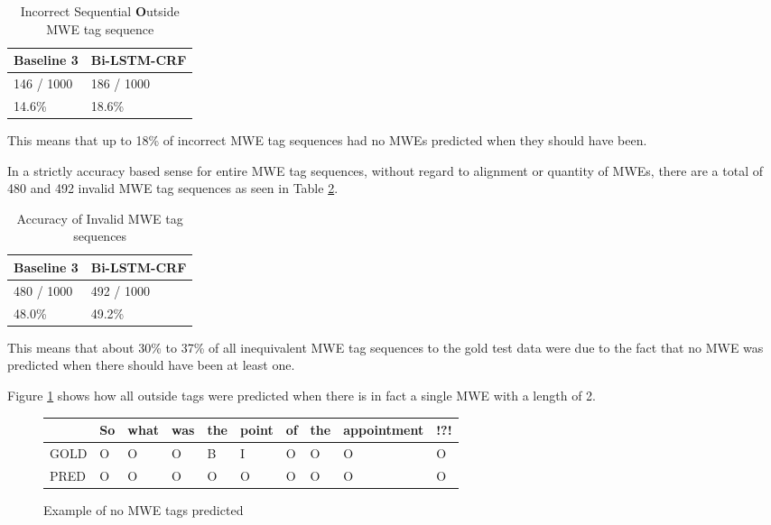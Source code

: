 \begin{table}[H]
    \centering
    \begin{tabular}{ll}
      Baseline 3 & Bi-LSTM-CRF\\
      \hline
      146 / 1000 & 186 / 1000\\
      14.6\% & 18.6\%
    \end{tabular}
  \caption{Incorrect Sequential {\bf O}utside MWE tag sequence}
  \label{tab:inseqoutmwetagseq}
\end{table}

This means that up to 18\% of incorrect MWE tag sequences had no MWEs predicted when they should have been. 

In a strictly accuracy based sense for entire MWE tag sequences, without regard to alignment or quantity of MWEs, there are a total of 480 and 492 invalid MWE tag sequences as seen in Table \ref{tab:accuracyinvalidtagseq}. 

\begin{table}[H]
    \centering
    \begin{tabular}{ll}
      Baseline 3 & Bi-LSTM-CRF\\
      \hline
      480 / 1000 & 492 / 1000\\
      48.0\% & 49.2\%
    \end{tabular}
  \caption{Accuracy of Invalid MWE tag sequences}
  \label{tab:accuracyinvalidtagseq}
\end{table}

This means that about 30\% to 37\% of all inequivalent MWE tag sequences to the gold test data were due to the fact that no MWE was predicted when there should have been at least one. 

Figure \ref{fig:nomwepred} shows how all outside tags were predicted when there is in fact a single MWE with a length of 2.

\begin{figure}[H]
    \centering
    \begin{tabular}{l|lllllllll}
           & So & what & was & the & point & of & the & appointment & !?!\\
      \hline
      \rowcolor{yellow!50}
      GOLD & O  & O    & O   & B   & I     & O  & O   & O           & O\\
      PRED & O  & O    & O   & O   & O     & O  & O   & O           & O\\
    \end{tabular}
  \caption{Example of no MWE tags predicted}
  \label{fig:nomwepred}
\end{figure}

